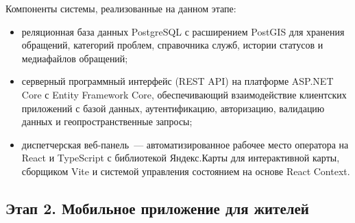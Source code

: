 Компоненты системы, реализованные на данном этапе:
\begin{itemize}
    \item реляционная база данных PostgreSQL с расширением PostGIS для хранения
          обращений, категорий проблем, справочника служб, истории статусов
          и медиафайлов обращений;
    \item серверный программный интерфейс (REST API) на платформе ASP.NET Core
          с Entity Framework Core, обеспечивающий взаимодействие клиентских приложений
          с базой данных, аутентификацию, авторизацию, валидацию данных
          и геопространственные запросы;
    \item диспетчерская веб-панель~--- автоматизированное рабочее место оператора
          на React и TypeScript с библиотекой Яндекс.Карты для интерактивной карты, сборщиком
          Vite и системой управления состоянием на основе React Context.
\end{itemize}

\subsection{Этап 2. Мобильное приложение для жителей}

